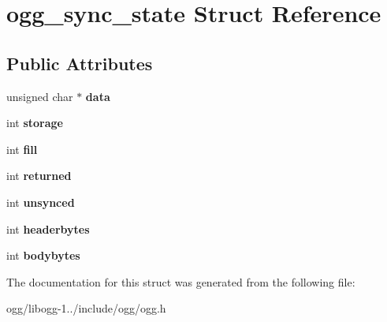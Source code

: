 \hypertarget{structogg__sync__state}{\section{ogg\+\_\+sync\+\_\+state Struct Reference}
\label{structogg__sync__state}
}
\subsection*{Public Attributes}
\begin{DoxyCompactItemize}
\item 
\hypertarget{structogg__sync__state_aa1c21a8d362a6ebf4d0c303bc9fa9be6}{unsigned char $\ast$ {\bfseries data}}\label{structogg__sync__state_aa1c21a8d362a6ebf4d0c303bc9fa9be6}

\item 
\hypertarget{structogg__sync__state_a15fc1bb5161fc4ae87b7a65982776c24}{int {\bfseries storage}}\label{structogg__sync__state_a15fc1bb5161fc4ae87b7a65982776c24}

\item 
\hypertarget{structogg__sync__state_a3afef65cd358eab5827304b8c2360c7f}{int {\bfseries fill}}\label{structogg__sync__state_a3afef65cd358eab5827304b8c2360c7f}

\item 
\hypertarget{structogg__sync__state_ac1b56ee81f71737f2f6397907f55a2e9}{int {\bfseries returned}}\label{structogg__sync__state_ac1b56ee81f71737f2f6397907f55a2e9}

\item 
\hypertarget{structogg__sync__state_a8d538bb32400470f00080e2160158a76}{int {\bfseries unsynced}}\label{structogg__sync__state_a8d538bb32400470f00080e2160158a76}

\item 
\hypertarget{structogg__sync__state_abb64d78f386bc413527df838f2f681d5}{int {\bfseries headerbytes}}\label{structogg__sync__state_abb64d78f386bc413527df838f2f681d5}

\item 
\hypertarget{structogg__sync__state_aa7ea6e81b751baaa04e4b49cb04e8317}{int {\bfseries bodybytes}}\label{structogg__sync__state_aa7ea6e81b751baaa04e4b49cb04e8317}

\end{DoxyCompactItemize}


The documentation for this struct was generated from the following file\+:\begin{DoxyCompactItemize}
\item 
ogg/libogg-\/1../include/ogg/ogg.\+h\end{DoxyCompactItemize}
